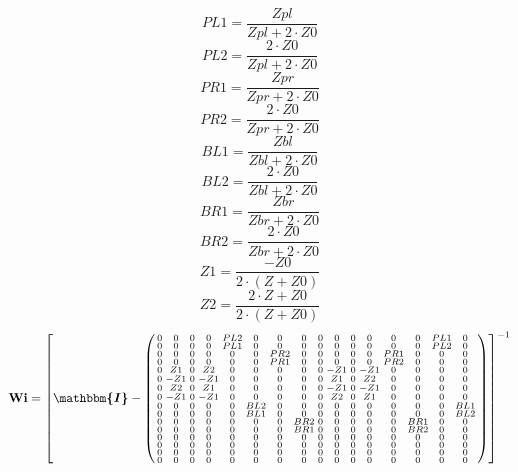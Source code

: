 \[ PL1=\frac{Zpl}{Zpl+2\cdot Z0} \]
\[ PL2=\frac{2\cdot Z0}{Zpl+2\cdot Z0} \]
\[ PR1=\frac{Zpr}{Zpr+2\cdot Z0} \]
\[ PR2=\frac{2\cdot Z0}{Zpr+2\cdot Z0} \]
\[ BL1=\frac{Zbl}{Zbl+2\cdot Z0} \]
\[ BL2=\frac{2\cdot Z0}{Zbl+2\cdot Z0} \]
\[ BR1=\frac{Zbr}{Zbr+2\cdot Z0} \]
\[ BR2=\frac{2\cdot Z0}{Zbr+2\cdot Z0} \]
\[ Z1=\frac{-Z0}{2\cdot  (Z+Z0 )} \]
\[ Z2=\frac{2\cdot Z+Z0}{2\cdot  (Z+Z0 )} \]
\[ \mathbf{Wi} =  \left[ \boldsymbol{\mathbbm{I}}  -
\left(\begin{smallmatrix} 0 & 0 & 0 & 0 & PL2 & 0 & 0 & 0 & 0 & 0 & 0
& 0 & 0 & 0 & PL1 & 0 \\ 0 & 0 & 0 & 0 & PL1 & 0 & 0 & 0 & 0 & 0 & 0 &
0 & 0 & 0 & PL2 & 0 \\ 0 & 0 & 0 & 0 & 0 & 0 & PR2 & 0 & 0 & 0 & 0 & 0
& PR1 & 0 & 0 & 0 \\ 0 & 0 & 0 & 0 & 0 & 0 & PR1 & 0 & 0 & 0 & 0 & 0 &
PR2 & 0 & 0 & 0 \\ 0 & Z1 & 0 & Z2 & 0 & 0 & 0 & 0 & 0 & -Z1 & 0 & -Z1
& 0 & 0 & 0 & 0 \\ 0 & -Z1 & 0 & -Z1 & 0 & 0 & 0 & 0 & 0 & Z1 & 0 & Z2
& 0 & 0 & 0 & 0 \\ 0 & Z2 & 0 & Z1 & 0 & 0 & 0 & 0 & 0 & -Z1 & 0 & -Z1
& 0 & 0 & 0 & 0 \\ 0 & -Z1 & 0 & -Z1 & 0 & 0 & 0 & 0 & 0 & Z2 & 0 & Z1
& 0 & 0 & 0 & 0 \\ 0 & 0 & 0 & 0 & 0 & BL2 & 0 & 0 & 0 & 0 & 0 & 0 & 0
& 0 & 0 & BL1 \\ 0 & 0 & 0 & 0 & 0 & BL1 & 0 & 0 & 0 & 0 & 0 & 0 & 0 &
0 & 0 & BL2 \\ 0 & 0 & 0 & 0 & 0 & 0 & 0 & BR2 & 0 & 0 & 0 & 0 & 0 &
BR1 & 0 & 0 \\ 0 & 0 & 0 & 0 & 0 & 0 & 0 & BR1 & 0 & 0 & 0 & 0 & 0 &
BR2 & 0 & 0 \\ 0 & 0 & 0 & 0 & 0 & 0 & 0 & 0 & 0 & 0 & 0 & 0 & 0 & 0 &
0 & 0 \\ 0 & 0 & 0 & 0 & 0 & 0 & 0 & 0 & 0 & 0 & 0 & 0 & 0 & 0 & 0 & 0
\\ 0 & 0 & 0 & 0 & 0 & 0 & 0 & 0 & 0 & 0 & 0 & 0 & 0 & 0 & 0 & 0 \\ 0
& 0 & 0 & 0 & 0 & 0 & 0 & 0 & 0 & 0 & 0 & 0 & 0 & 0 & 0 & 0
\end{smallmatrix}\right) \right]^{-1}  \]

